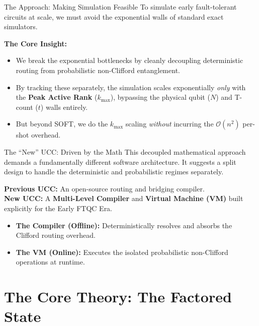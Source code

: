 \documentclass[11pt, aspectratio=169]{beamer}
\begin{document}
\begin{frame}{The Approach: Making Simulation Feasible}
  To simulate early fault-tolerant circuits at scale, we must avoid the exponential walls of standard exact simulators.

  \vspace{1em}
  \textbf{The Core Insight:}
  \begin{itemize}
      \item We break the exponential bottlenecks by cleanly decoupling deterministic routing from probabilistic non-Clifford entanglement.
      \item By tracking these separately, the simulation scales exponentially \textit{only} with the \textbf{Peak Active Rank} ($k_{\max}$), bypassing the physical qubit ($N$) and T-count ($t$) walls entirely.
      \item But beyond SOFT, we do the $k_{\max}$ scaling \textit{without} incurring the \alert{$\mathcal{O}(n^2)$} per-shot overhead.
  \end{itemize}
\end{frame}

\begin{frame}{The ``New'' UCC: Driven by the Math}
  This decoupled mathematical approach demands a fundamentally different software architecture. It suggests a split design to handle the deterministic and probabilistic regimes separately.
  \vspace{1em}

  \textbf{Previous UCC:} An open-source routing and bridging compiler. \\
  \vspace{0.5em}
  \textbf{New UCC:} A \textbf{Multi-Level Compiler} and \textbf{Virtual Machine (VM)} built explicitly for the Early FTQC Era.

  \vspace{1em}
  \begin{itemize}
      \item \textbf{The Compiler (Offline):} Deterministically resolves and absorbs the Clifford routing overhead.
      \item \textbf{The VM (Online):} Executes the isolated probabilistic non-Clifford operations at runtime.
  \end{itemize}
\end{frame}

\section{The Core Theory: The Factored State}
\end{document}
